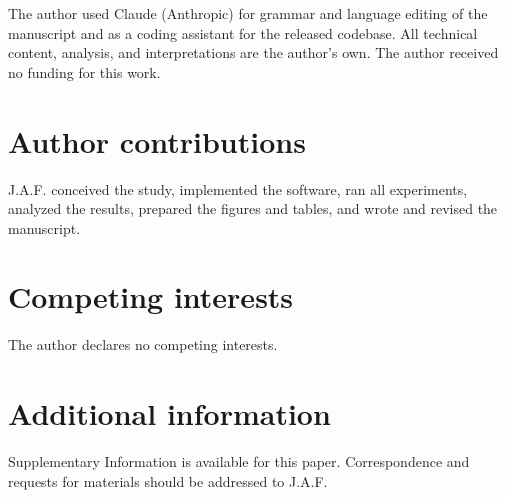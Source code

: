 \documentclass[pdflatex,sn-nature,lineno]{sn-jnl}
\begin{document}
The author used Claude (Anthropic) for grammar and language editing of the manuscript and as a coding assistant for the released codebase. All technical content, analysis, and interpretations are the author's own. The author received no funding for this work.

\section*{Author contributions}
J.A.F. conceived the study, implemented the software, ran all experiments, analyzed the results, prepared the figures and tables, and wrote and revised the manuscript.

\section*{Competing interests}
The author declares no competing interests.

\section*{Additional information}
Supplementary Information is available for this paper. Correspondence and requests for materials should be addressed to J.A.F.
\end{document}
